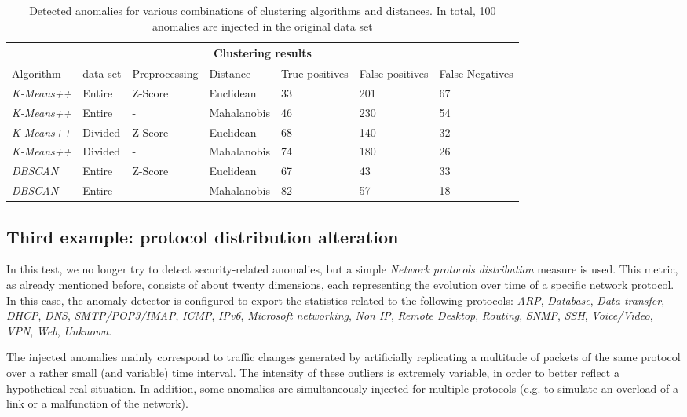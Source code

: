 \documentclass[12pt,a4paper,cucitura]{toptesi}
\begin{document}
\begin{center}
\begin{table}
\centering
\begin{tabular}{l|l|l|l|p{1.5cm}|p{1.5cm}|p{1.5cm}}
\hline
\hline
\multicolumn{7}{c}{Clustering results} \\
\hline
Algorithm & data set & Preprocessing & Distance & True positives & False positives & False Negatives \\
\hline
\emph{K-Means++} & Entire & Z-Score & Euclidean & 33 & 201 & 67 \\
\emph{K-Means++} & Entire & - & Mahalanobis & 46 & 230 & 54 \\
\emph{K-Means++} & Divided & Z-Score & Euclidean & 68 & 140 & 32 \\
\emph{K-Means++} & Divided & - & Mahalanobis & 74 & 180 & 26 \\
\emph{DBSCAN} & Entire & Z-Score & Euclidean & 67 & 43 & 33 \\
\emph{DBSCAN} & Entire & - & Mahalanobis & 82 & 57 & 18 \\
\hline
\hline
\end{tabular}
\caption[Vertical scan - detected anomalies]{Detected anomalies for various combinations of clustering algorithms and distances. In total, 100 anomalies are injected in the original data set}
\label{tab-scan}
\end{table}
\end{center}

\subsection{Third example: protocol distribution alteration}

In this test, we no longer try to detect security-related anomalies, but a simple \emph{Network protocols distribution} measure is used.
This metric, as already mentioned before, consists of about twenty dimensions, each representing the evolution over time of a specific network protocol.
In this case, the anomaly detector is configured to export the statistics related to the following protocols: \emph{ARP}, \emph{Database}, \emph{Data transfer}, \emph{DHCP}, \emph{DNS}, \emph{SMTP/POP3/IMAP}, \emph{ICMP}, \emph{IPv6}, \emph{Microsoft networking}, \emph{Non IP}, \emph{Remote Desktop}, \emph{Routing}, \emph{SNMP}, \emph{SSH}, \emph{Voice/Video}, \emph{VPN}, \emph{Web}, \emph{Unknown}.

The injected anomalies mainly correspond to traffic changes generated by artificially replicating a multitude of packets of the same protocol over a rather small (and variable) time interval.
The intensity of these outliers is extremely variable, in order to better reflect a hypothetical real situation.
In addition, some anomalies are simultaneously injected for multiple protocols (e.g. to simulate an overload of a link or a malfunction of the network).
\end{document}
